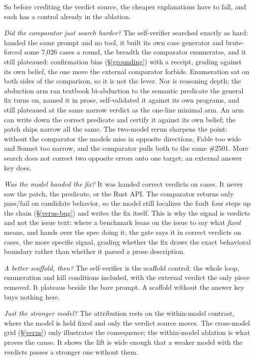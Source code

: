 \documentclass[
  10pt,
]{article}
\begin{document}
So before crediting the verdict source, the cheaper explanations have to
fall, and each has a control already in the ablation.

\emph{Did the comparator just search harder?} The self-verifier searched
exactly as hard: handed the same prompt and no tool, it built its own
case generator and brute-forced some 7,026 cases a round, the breadth
the comparator enumerates, and it still plateaued: confirmation bias
(\S\ref{grounding}) with a receipt, grading against its own belief, the
one move the external comparator forbids. Enumeration sat on both sides
of the comparison, so it is not the lever. Nor is reasoning depth: the
abduction arm ran textbook bi-abduction to the semantic predicate the
general fix turns on, named it in prose, self-validated it against its
own programs, and still plateaued at the same narrow verdict as the
one-line minimal arm. An arm can write down the correct predicate and
certify it against its own belief; the patch ships narrow all the same.
The two-model rerun sharpens the point: without the comparator the models
miss in opposite directions, Fable too wide and Sonnet too narrow, and
the comparator pulls both to the same \#2501. More search does not correct
two opposite errors onto one target; an external answer key does.

\emph{Was the model handed the fix?} It was handed correct verdicts on
cases. It never saw the patch, the predicate, or the Rust API. The
comparator returns only pass/fail on candidate behavior, so the model
still localizes the fault four steps up the chain (\S\ref{verus-bug})
and writes the fix itself. This is why the signal is verdicts and not
the issue text: where a benchmark leans on the issue to say what
\emph{fixed} means, and hands over the spec doing it, the gate says it
in correct verdicts on cases, the more specific signal, grading whether
the fix draws the exact behavioral boundary rather than whether it
parsed a prose description.

\emph{A better scaffold, then?} The self-verifier is the scaffold
control: the whole loop, enumeration and kill conditions included, with
the external verdict the only piece removed. It plateaus beside the bare
prompt. A scaffold without the answer key buys nothing here.

\emph{Just the stronger model?} The attribution rests on the
within-model contrast, where the model is held fixed and only the
verdict source moves. The cross-model grid (\S\ref{verus}) only
illustrates the consequence; the within-model ablation is what proves
the cause. It shows the lift is wide enough that a weaker model with the
verdicts passes a stronger one without them.
\end{document}
